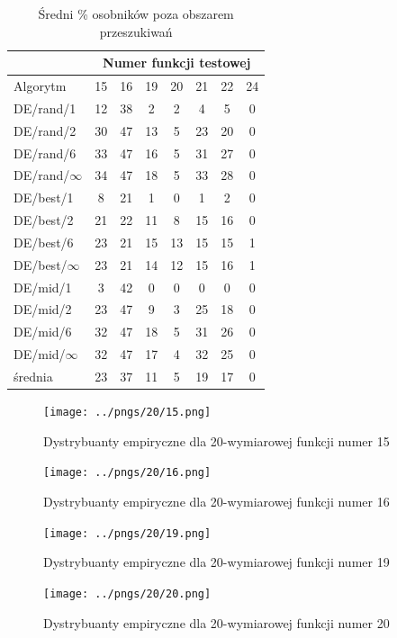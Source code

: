\documentclass[a4paper,onecolumn,oneside,12pt,wide,floatssmall]{mwrep}
\theoremstyle{definition}
\theoremstyle{plain}%
\theoremstyle{remark}
\begin{document}
\begin{table}[H]
\centering
\begin{tabular}{ l | c | c | c | c | c | c | c }
		 & \multicolumn{7}{c}{Numer funkcji testowej}  \\  \hline
Algorytm         &15& 16& 19& 20& 21& 22& 24 \\ \hline
DE/rand/1	 & 12 & 38 & 2 & 2 & 4 & 5 & 0   \\
DE/rand/2	 & 30 & 47 & 13 & 5 & 23 & 20 & 0  \\
DE/rand/6	 & 33 & 47 & 16 & 5 & 31 & 27 & 0     \\
DE/rand/$\infty$ & 34 & 47 & 18 & 5 & 33 & 28 & 0  \\
DE/best/1	 & 8 & 21 & 1 & 0 & 1 & 2 & 0      \\
DE/best/2	 & 21 & 22 & 11 & 8 & 15 & 16 & 0   \\
DE/best/6	 & 23 & 21 & 15 & 13 & 15 & 15 & 1      \\
DE/best/$\infty$ & 23 & 21 & 14 & 12 & 15 & 16 & 1 \\
DE/mid/1         & 3 & 42 & 0 & 0 & 0 & 0 & 0  \\
DE/mid/2	 & 23 & 47 & 9 & 3 & 25 & 18 & 0  \\
DE/mid/6	 & 32 & 47 & 18 & 5 & 31 & 26 & 0  \\
DE/mid/$\infty$	 & 32 & 47 & 17 & 4 & 32 & 25 & 0 \\ \hline
średnia          & 23 & 37 & 11 & 5 & 19 & 17 & 0 \\  
\end{tabular}
\caption{Średni \% osobników poza obszarem przeszukiwań}
\end{table}

\begin{figure}[H]
\centering
\texttt{[image: ../pngs/20/15.png]}
\caption{Dystrybuanty empiryczne dla 20-wymiarowej funkcji numer 15}
\end{figure}

\begin{figure}[H]
\centering
\texttt{[image: ../pngs/20/16.png]} 
\caption{Dystrybuanty empiryczne dla 20-wymiarowej funkcji numer 16}
\end{figure}

\begin{figure}[H]
\centering
\texttt{[image: ../pngs/20/19.png]}
\caption{Dystrybuanty empiryczne dla 20-wymiarowej funkcji numer 19}
\end{figure}

\begin{figure}[H]
\centering
\texttt{[image: ../pngs/20/20.png]}
\caption{Dystrybuanty empiryczne dla 20-wymiarowej funkcji numer 20}
\end{figure}
\end{document}
